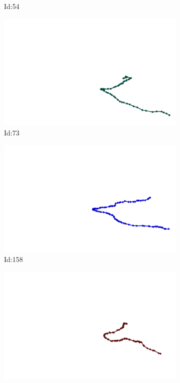 \documentclass[12pt,twoside]{report}
\begin{document}
\begin{figure}
\begin{subfigure}[b]{0.20\textwidth}
\caption{Id:54}
\end{subfigure}
\begin{subfigure}[b]{0.20\textwidth}
\centering
\includegraphics[width=\textwidth]{../trajectories/73.png}
\caption{Id:73}
\end{subfigure}
\begin{subfigure}[b]{0.20\textwidth}
\centering
\includegraphics[width=\textwidth]{../trajectories/158.png}
\caption{Id:158}
\end{subfigure}
\begin{subfigure}[b]{0.20\textwidth}
\centering
\includegraphics[width=\textwidth]{../trajectories/166.png}

\end{subfigure}
\end{figure}
\end{document}
